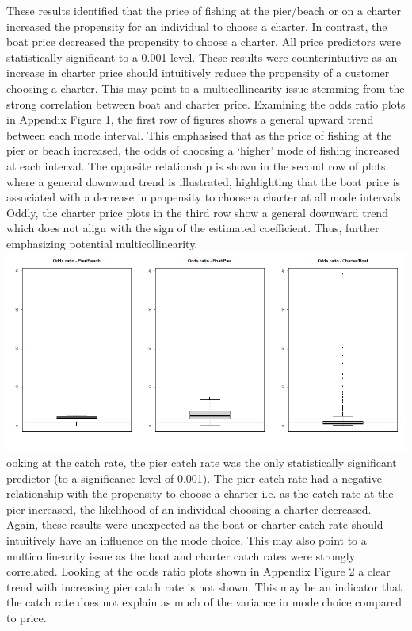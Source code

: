 \documentclass[12pt]{article}
\begin{document}
{These results identified that the price of fishing at the pier/beach or on a charter increased the propensity for an individual to choose a charter. In contrast, the boat price decreased the propensity to choose a charter. All price predictors were statistically significant to a 0.001 level. These results were counterintuitive as an increase in charter price should intuitively reduce the propensity of a customer choosing a charter. This may point to a multicollinearity issue stemming from the strong correlation between boat and charter price. Examining the odds ratio plots in Appendix Figure 1, the first row of figures shows a general upward trend between each mode interval. This emphasised that as the price of fishing at the pier or beach increased, the odds of choosing a ‘higher’ mode of fishing increased at each interval. The opposite relationship is shown in the second row of plots where a general downward trend is illustrated, highlighting that the boat price is associated with a decrease in propensity to choose a charter at all mode intervals. Oddly, the charter price plots in the third row show a general downward trend which does not align with the sign of the estimated coefficient. Thus, further emphasizing potential multicollinearity.\\ 

\includegraphics[scale=0.5]{Ordered Odds 1}\\

ooking at the catch rate, the pier catch rate was the only statistically significant predictor (to a significance level of 0.001). The pier catch rate had a negative relationship with the propensity to choose a charter i.e. as the catch rate at the pier increased, the likelihood of an individual choosing a charter decreased. Again, these results were unexpected as the boat or charter catch rate should intuitively have an influence on the mode choice. This may also point to a multicollinearity issue as the boat and charter catch rates were strongly correlated. Looking at the odds ratio plots shown in Appendix Figure 2 a clear trend with increasing pier catch rate is not shown. This may be an indicator that the catch rate does not explain as much of the variance in mode choice compared to price.\\

}
\end{document}
